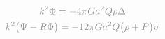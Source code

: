 \documentclass[preview]{standalone}
\begin{document}
\begin{gather}
\notag
\textcolor{Gray}{k^2 \Phi = - 4 \pi G a^2 Q \rho \Delta} \\
\notag
\textcolor{Gray}{k^2 \bigl( \Psi - R \Phi \bigr) = - 12 \pi G a^2 Q \bigl( \rho + P \bigr)\sigma }
\end{gather}
\end{document}
